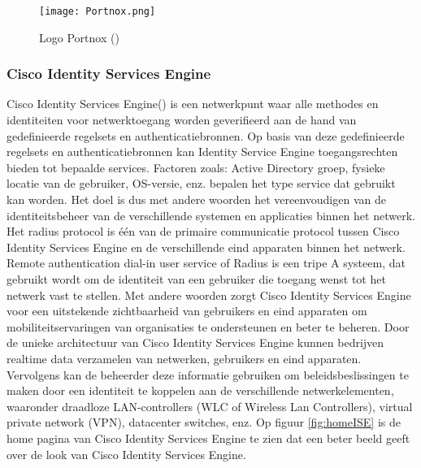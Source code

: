 \begin{figure}[H]
	\centering
	\texttt{[image: Portnox.png]}
	\caption{Logo Portnox (\cite{PortnoxLogo})}
	\label{fig:Portnox}
\end{figure}

\subsubsection{\bf Cisco Identity Services Engine}
Cisco Identity Services Engine(\cite{ISE}) is een netwerkpunt waar alle methodes en identiteiten voor netwerktoegang worden geverifieerd aan de hand van gedefinieerde regelsets en authenticatiebronnen. Op basis van deze gedefinieerde regelsets en authenticatiebronnen kan Identity Service Engine toegangsrechten bieden tot bepaalde services. Factoren zoals: Active Directory groep, fysieke locatie van de gebruiker, OS-versie, enz. bepalen het type service dat gebruikt kan worden. Het doel is dus met andere woorden het vereenvoudigen van de identiteitsbeheer van de verschillende systemen en applicaties binnen het netwerk.
\newline
\newline   
Het radius protocol is één van de primaire communicatie protocol tussen Cisco Identity Services Engine en de verschillende eind apparaten binnen het netwerk.
\newline
\newline 
Remote authentication dial-in user service of Radius is een tripe A systeem, dat gebruikt wordt om de identiteit van een gebruiker die toegang wenst tot het netwerk vast te stellen. Met andere woorden zorgt Cisco Identity Services Engine voor een uitstekende zichtbaarheid van gebruikers en eind apparaten om mobiliteitservaringen van organisaties te ondersteunen en beter te beheren.
\newline
\newline
Door de unieke architectuur van Cisco Identity Services Engine kunnen bedrijven realtime data verzamelen van netwerken, gebruikers en eind apparaten. Vervolgens kan de beheerder deze informatie gebruiken om beleidsbeslissingen te maken door een identiteit te koppelen aan de verschillende netwerkelementen, waaronder draadloze LAN-controllers (WLC of Wireless Lan Controllers), virtual private network (VPN), datacenter switches, enz. Op figuur \ref{fig:homeISE} is de home pagina van Cisco Identity Services Engine te zien dat een beter beeld geeft over de look van Cisco Identity Services Engine.

